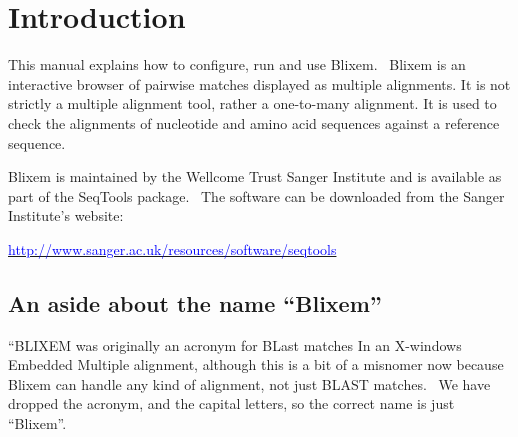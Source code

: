 \documentclass[letterpaper]{article}
\newcommand\textstyleInternetlink[1]{\textcolor{blue}{#1}}
\begin{document}
\bigskip

\setcounter{tocdepth}{10}
\renewcommand\contentsname{Contents}

\clearpage\tableofcontents

\clearpage
{\color[rgb]{0.0,0.27058825,0.5254902}\section[Introduction]{Introduction}}
\hypertarget{RefHeading1421056909880}{}{
{This manual explains how to configure, run and
use Blixem. \ }{Blixem is an interactive
browser of pairwise matches displayed as multiple alignments. It is not
strictly a multiple alignment tool, rather a
{\textquotesingle}one-to-many{\textquotesingle} alignment. It is used
to check the alignments of nucleotide and amino acid sequences against
a reference sequence.}}


\bigskip

Blixem is maintained by the Wellcome Trust
Sanger Institute and is available as part of the SeqTools package.
\ The software can be downloaded from the Sanger
Institute{\textquoteright}s website:

\href{http://www.sanger.ac.uk/resources/software/seqtools/}
{\textstyleInternetlink{http://www.sanger.ac.uk/resources/software/seqtools}}

{\color[rgb]{0.30980393,0.5058824,0.7411765}\subsection[An aside about the name
{\textquotedblleft}Blixem{\textquotedblright}]{An aside about the name {\textquotedblleft}Blixem{\textquotedblright}}}
\hypertarget{RefHeading1441056909880}{}{
{{\textquotedblleft}BLIXEM{\textquotedbl} was
originally an acronym for
}{{\textquotedbl}BLast matches In an X-windows
Embedded Multiple alignment{\textquotedbl}, although this is a bit of a
misnomer now because Blixem can handle any kind of alignment, not just
BLAST matches. \ We have dropped the acronym, and the capital letters,
so the correct name is just
{\textquotedblleft}Blixem{\textquotedblright}.}}
\end{document}
